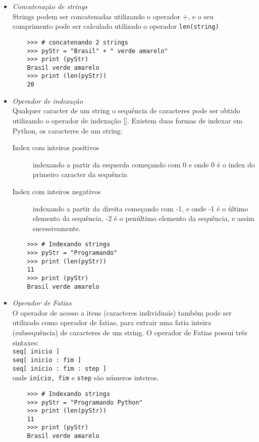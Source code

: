     \begin{itemize}
      \item \textit{Concatena\c{c}\~{a}o de strings}\\
            Strings podem ser concatenadas utilizando o operador +, e o seu comprimento pode ser calculado utilizado o operador \texttt{len(string)}
     \begin{lstlisting}
    >>> # concatenando 2 strings
    >>> pyStr = "Brasil" + " verde amarelo"
    >>> print (pyStr)
    Brasil verde amarelo
    >>> print (len(pyStr))
    20
    \end{lstlisting}

      \item \textit{Operador de indexa\c{c}\~{a}o}\\
      Qualquer caracter de um string o sequ\^{e}ncia de caracteres pode ser obtido utilizando o operador de indexa\c{c}\~{a}o []. Existem duas formas de indexar em Python, os caracteres de um string:\\
      \begin{description}
        \item[Index com inteiros positivos] indexando a partir da esquerda come\c{c}ando com 0 e  onde 0 \'{e} o index do primeiro caracter da sequ\^{e}ncia
        \item[Index com inteiros negativos] indexando a partir da direita come\c{c}ando com -1, e onde -1 \'{e} o \'{u}ltimo elemento da sequ\^{e}ncia, -2 \'{e} o pen\'{u}ltimo elemento da sequ\^{e}ncia, e assim sucessivamente.
      \end{description}

     \begin{lstlisting}
    >>> # Indexando strings
    >>> pyStr = "Programando"
    >>> print (len(pyStr))
    11
    >>> print (pyStr)
    Brasil verde amarelo
        \end{lstlisting}




      \item \textit{Operador de Fatias}\\
      O operador de acesso a itens (caracteres individuais) tamb\'{e}m pode ser utilizado como operador de fatias, para extrair uma fatia inteira (subsequ\^{e}ncia) de caracteres de um string. O operador de Fatias possui tr\^{e}s sintaxes:\\
      \texttt{seq[ inicio ]}\\
      \texttt{seq[ inicio : fim ]} \\
      \texttt{seq[ in\'{\i}cio : fim : step ]}\\
      onde \texttt{in\'{\i}cio, fim} e \texttt{step} s\~{a}o n\'{u}meros inteiros.
     \begin{lstlisting}
    >>> # Indexando strings
    >>> pyStr = "Programando Python"
    >>> print (len(pyStr))
    11
    >>> print (pyStr)
    Brasil verde amarelo
        \end{lstlisting}

    \end{itemize}


